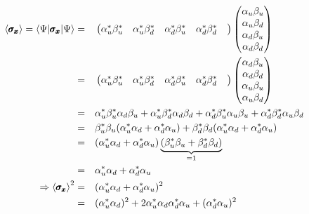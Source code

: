 \documentclass[solutions.tex]{subfiles}
\begin{document}
\begin{equation*}\begin{aligned}
	\left\langle \pmb{\sigma_x} \right\rangle = \langle \Psi|\pmb{\sigma_x}|\Psi\rangle
		&=&& \begin{pmatrix}
			\alpha_u^*\beta_u^* &
			\alpha_u^*\beta_d^* &
			\alpha_d^*\beta_u^* &
			\alpha_d^*\beta_d^* &
		\end{pmatrix}\begin{pmatrix}
			\alpha_u\beta_u \\
			\alpha_u\beta_d \\
			\alpha_d\beta_u \\
			\alpha_d\beta_d \\
		\end{pmatrix} \\
	~ &=&& \begin{pmatrix}
			\alpha_u^*\beta_u^* &
			\alpha_u^*\beta_d^* &
			\alpha_d^*\beta_u^* &
			\alpha_d^*\beta_d^* &
		\end{pmatrix}\begin{pmatrix}
			\alpha_d\beta_u \\
			\alpha_d\beta_d \\
			\alpha_u\beta_u \\
			\alpha_u\beta_d \\
		\end{pmatrix} \\
	~ &=&& \alpha_u^*\beta_u^*\alpha_d\beta_u
		+ \alpha_u^*\beta_d^*\alpha_d\beta_d
		+ \alpha_d^*\beta_u^*\alpha_u\beta_u
		+ \alpha_d^*\beta_d^*\alpha_u\beta_d \\
	~ &=&&\beta_u^*\beta_u(\alpha_u^*\alpha_d+\alpha_d^*\alpha_u)
		+\beta_d^*\beta_d(\alpha_u^*\alpha_d+\alpha_d^*\alpha_u) \\
	~ &=&&(\alpha_u^*\alpha_d+\alpha_d^*\alpha_u)
		\underbrace{(\beta_u^*\beta_u+\beta_d^*\beta_d)}_{=1} \\
	~ &=&&\alpha_u^*\alpha_d+\alpha_d^*\alpha_u \\
	\Rightarrow\left\langle \pmb{\sigma_x} \right\rangle^2 &=&&
		(\alpha_u^*\alpha_d+\alpha_d^*\alpha_u)^2 \\
	~ &=&&(\alpha_u^*\alpha_d)^2 + 2\alpha_u^*\alpha_d\alpha_d^*\alpha_u + (\alpha_d^*\alpha_u)^2 \\
\end{aligned}\end{equation*}
\end{document}
